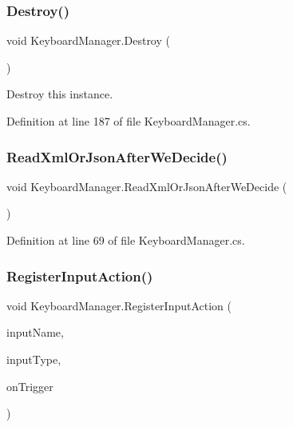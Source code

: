 \subsubsection{\texorpdfstring{Destroy()}{Destroy()}}
{\footnotesize\ttfamily void Keyboard\+Manager.\+Destroy (\begin{DoxyParamCaption}{ }\end{DoxyParamCaption})}



Destroy this instance. 



Definition at line 187 of file Keyboard\+Manager.\+cs.

\mbox{\label{class_keyboard_manager_a1e1c00f7abd67e4f784cb3ca8497f6de}} 
\subsubsection{\texorpdfstring{Read\+Xml\+Or\+Json\+After\+We\+Decide()}{ReadXmlOrJsonAfterWeDecide()}}
{\footnotesize\ttfamily void Keyboard\+Manager.\+Read\+Xml\+Or\+Json\+After\+We\+Decide (\begin{DoxyParamCaption}{ }\end{DoxyParamCaption})}



Definition at line 69 of file Keyboard\+Manager.\+cs.

\mbox{\label{class_keyboard_manager_a5981403c950a8151472aecc921d2fcb5}} 
\subsubsection{\texorpdfstring{Register\+Input\+Action()}{RegisterInputAction()}}
{\footnotesize\ttfamily void Keyboard\+Manager.\+Register\+Input\+Action (\begin{DoxyParamCaption}\item[{string}]{input\+Name,  }\item[{\hyperlink{_keyboard_mapped_input_type_8cs_ae342fcbcca71b2c821363b14ed799463}{Keyboard\+Mapped\+Input\+Type}}]{input\+Type,  }\item[{Action}]{on\+Trigger }\end{DoxyParamCaption})}



